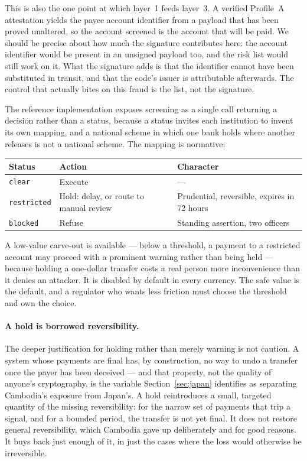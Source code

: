 \documentclass[10pt,a4paper,twocolumn]{article}
\makeatletter
\newcommand{\code}[1]{\texttt{\small #1}}
\newcommand{\threecol}{@{}p{0.19\columnwidth}p{0.36\columnwidth}p{0.37\columnwidth}@{}}
\newcommand{\threecol}{@{}lll@{}}
\makeatother
\begin{document}
This is also the one point at which layer~1 feeds layer~3. A verified Profile~A
attestation yields the payee account identifier from a payload that has been
proved unaltered, so the account screened is the account that will be paid. We
should be precise about how much the signature contributes here: the account
identifier would be present in an unsigned payload too, and the risk list would
still work on it. What the signature adds is that the identifier cannot have
been substituted in transit, and that the code's issuer is attributable
afterwards. The control that actually bites on this fraud is the list, not the
signature.

The reference implementation exposes screening as a single call returning a
decision rather than a status, because a status invites each institution to
invent its own mapping, and a national scheme in which one bank holds where
another releases is not a national scheme. The mapping is normative:

\begin{center}
\small
\begin{tabular}{\threecol}
\toprule
\textbf{Status} & \textbf{Action} & \textbf{Character} \\
\midrule
\code{clear}      & Execute & --- \\
\code{restricted} & Hold: delay, or route to manual review & Prudential, reversible, expires in 72 hours \\
\code{blocked}    & Refuse & Standing assertion, two officers \\
\bottomrule
\end{tabular}
\end{center}

A low-value carve-out is available --- below a threshold, a payment to a
restricted account may proceed with a prominent warning rather than being held
--- because holding a one-dollar transfer costs a real person more inconvenience
than it denies an attacker. It is disabled by default in every currency. The
safe value is the default, and a regulator who wants less friction must choose
the threshold and own the choice.

\paragraph{A hold is borrowed reversibility.}
The deeper justification for holding rather than merely warning is not caution.
A system whose payments are final has, by construction, no way to undo a
transfer once the payer has been deceived --- and that property, not the quality
of anyone's cryptography, is the variable Section~\ref{sec:japan} identifies as
separating Cambodia's exposure from Japan's. A hold reintroduces a small,
targeted quantity of the missing reversibility: for the narrow set of payments
that trip a signal, and for a bounded period, the transfer is not yet final. It
does not restore general reversibility, which Cambodia gave up deliberately and
for good reasons. It buys back just enough of it, in just the cases where the
loss would otherwise be irreversible.
\end{document}
